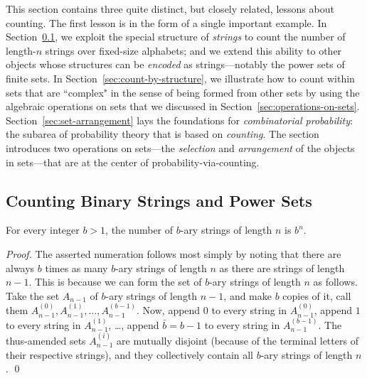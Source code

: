 This section contains three quite distinct, but closely related, lessons about counting.  The first lesson is in the form of a single important example.  In Section~\ref{sec:b-ary strings}, we exploit the special structure of {\em strings} to count the number of length-$n$ strings over fixed-size alphabets; and we extend this ability to other objects whose structures can be {\em encoded} as strings---notably the power sets of finite sets.  In Section~\ref{sec:count-by-structure}, we illustrate how to count within sets that are ``complex" in the sense of being formed from other sets by using the algebraic operations on sets that we discussed in Section~\ref{sec:operations-on-sets}.  Section~\ref{sec:set-arrangement} lays the foundations for {\em combinatorial probability}: the subarea of probability theory that is based on {\em counting}.  The section 
introduces two operations on sets---the {\em selection} and {\em arrangement} of the objects in sets---that are at the center of probability-via-counting.

\subsection{Counting Binary Strings and Power Sets}
\label{sec:b-ary strings}

\begin{prop}
\label{thm:b-ary strings}
For every integer $b > 1$, the number of $b$-ary strings of length $n$ is $b^n$.
\end{prop}

\begin{proof}
The asserted numeration follows most simply by noting that there are always $b$ times as many $b$-ary strings of length $n$ as there are strings of length $n-1$.  This is because we can form the set of $b$-ary strings of length $n$ as follows.  Take the set $A_{n-1}$ of $b$-ary strings of length $n-1$, and make $b$ copies of it, call them $A^{(0)}_{n-1}, A^{(1)}_{n-1}, \ldots, A^{(b-1)}_{n-1}$.  Now, append $0$ to every string in $A^{(0)}_{n-1}$, append $1$ to every string in
$A^{(1)}_{n-1}$, \ldots, append $\bar{b} = b-1$ to every string in $A^{(b-1)}_{n-1}$.  The thus-amended sets $A^{(i)}_{n-1}$ are mutually disjoint (because of the terminal letters of their respective strings), and they collectively contain all $b$-ary strings of length $n$.  \qed
\end{proof}

\medskip

